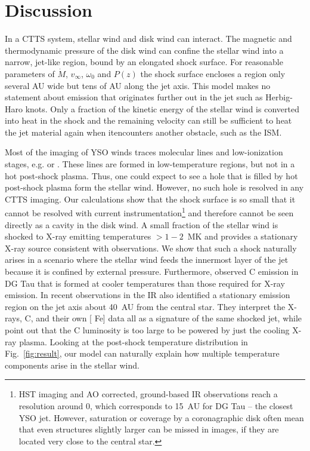 \section{Discussion}
\label{sect:discussion}
In a CTTS system, stellar wind and disk wind can interact. The magnetic and thermodynamic pressure of the disk wind can confine the stellar wind into a narrow, jet-like region, bound by an elongated shock surface. For reasonable parameters of $\dot M$, $v_\infty$, $\omega_0$ and $P(z)$ the shock surface encloses a region only several AU wide but tens of AU along the jet axis. This model makes no statement about emission that originates further out in the jet such as Herbig-Haro knots. Only a fraction of the kinetic energy of the stellar wind is converted into heat in the shock and the remaining velocity can still be sufficient to heat the jet material again when itencounters another obstacle, such as the ISM.

Most of the imaging of YSO winds traces molecular lines and low-ionization stages, e.g.  or . These lines are formed in low-temperature regions, but not in a hot post-shock plasma. Thus, one could expect to see a hole that is filled by hot post-shock plasma form the stellar wind. However, no such hole is resolved in any CTTS imaging. Our calculations show that the shock surface is so small that it cannot be resolved with current instrumentation\footnote{HST imaging and AO corrected, ground-based IR observations reach a resolution around 0, which corresponds to 15~AU for DG Tau -- the closest YSO jet. However, saturation or coverage by a coronagraphic disk often mean that even structures slightly larger can be missed in images, if they are located very close to the central star.} and therefore cannot be seen directly as a cavity in the disk wind. A small fraction of the stellar wind is shocked to X-ray emitting temperatures $>1-2$~MK and provides a stationary X-ray source consistent with observations. 
We show that such a shock naturally arises in a scenario where the stellar wind feeds the innermost layer of the jet because it is confined by external pressure.
Furthermore, \citet{2013A&A...550L...1S} observed C emission in DG Tau that is formed at cooler temperatures than those required for X-ray emission. In recent observations in the IR \citet{2014arXiv1404.0728W} also identified a stationary emission region on the jet axis about 40~AU from the central star. They interpret the X-rays,  C, and their own [ Fe] data all as a signature of the same shocked jet, while \citet{2013A&A...550L...1S} point out that the C luminosity is too large to be powered by just the cooling X-ray plasma. Looking at the post-shock temperature distribution in Fig.~\ref{fig:result}, our model can naturally explain how multiple temperature components arise in the stellar wind.

